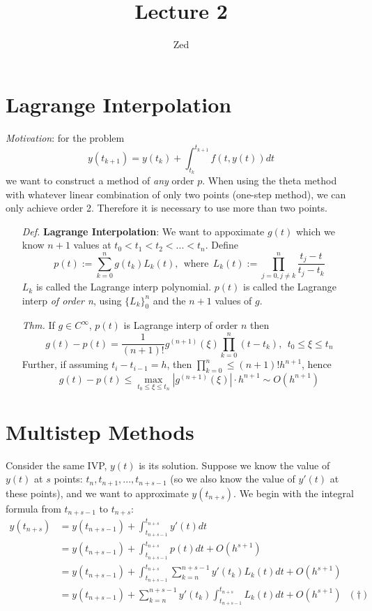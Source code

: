 \documentclass[a4paper, 11pt]{article}
\title{\textbf{Lecture 2}}
\author{Zed}{}
\begin{document}
\maketitle

\section{Lagrange Interpolation}
\emph{Motivation}: for the problem
$$
y(t_{k+1}) = y(t_k) + \int_{t_k}^{t_{k+1}} f(t, y(t))dt
$$
we want to construct a method of \emph{any} order $p$. When using the theta method with whatever linear combination of only two points (one-step method), we can only achieve order 2. Therefore it is necessary to use more than two points.

\begin{itemize}
	\item[\textit{Def.}] \textbf{Lagrange Interpolation}: We want to appoximate $g(t)$ which we know $n+1$ values at $t_0<t_1<t_2<...<t_n$. Define
	$$
	p(t) := \sum_{k=0}^n g(t_k)L_k(t),~~\text{where}~~L_k(t):=\prod_{j=0,j\ne k}^n\frac{t_j - t}{t_j - t_k}
	$$
	$L_k$ is called the Lagrange interp polynomial. $p(t)$ is called the Lagrange interp \emph{of order n}, using $\{L_k\}_0^n$ and the $n+1$ values of $g$.

	\item[\textit{Thm.}] If $g\in C^{\infty}$, $p(t)$ is Lagrange interp of order $n$ then
	$$
	g(t) - p(t) = \frac{1}{(n+1)!} g^{(n+1)}(\xi) \prod_{k=0}^n (t-t_k),~~t_0\leq\xi \leq t_n
	$$
	Further, if assuming $t_i-t_{i-1}=h$, then $\prod_{k=0}^n \leq (n+1)! h^{n+1}$, hence
	$$
	g(t) - p(t) \leq \max\limits_{t_0\leq \xi \leq t_n}|g^{(n+1)}(\xi)|\cdot h^{n+1} \sim O(h^{n+1})
	$$
\end{itemize}

\section{Multistep Methods}
Consider the same IVP, $y(t)$ is its solution. 
Suppose we know the value of $y(t)$ at $s$ points: $t_n, t_{n+1}, ..., t_{n+s-1}$ (so we also know the value of $y'(t)$ at these points), and we want to approximate $y(t_{n+s})$. We begin with the integral formula from $t_{n+s-1}$ to $t_{n+s}$:
\begin{equation}
	\begin{split}
		y(t_{n+s}) &= y(t_{n+s-1}) + \int_{t_{n+s-1}}^{t_{n+s}} y'(t) dt \\
		&= y(t_{n+s-1}) + \int_{t_{n+s-1}}^{t_{n+s}} p(t)dt + O(h^{s+1}) \\
		&= y(t_{n+s-1}) + \int_{t_{n+s-1}}^{t_{n+s}} \sum_{k=n}^{n+s-1}y'(t_k)L_k(t)dt + O(h^{s+1}) \\
		&= y(t_{n+s-1}) + \sum_{k=n}^{n+s-1}y'(t_k)\int_{t_{n+s-1}}^{t_{n+s}} L_k(t)dt + O(h^{s+1})~~~(\dag)\\
	\end{split}
\end{equation}
\end{document}
